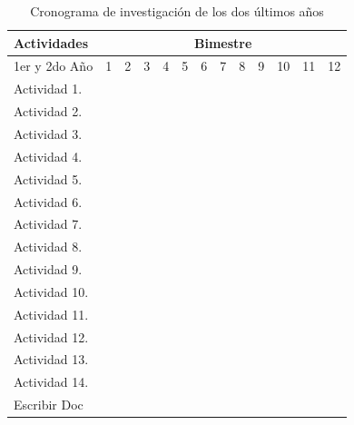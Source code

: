 \documentclass[12pt,twoside,onecolumn,letterpaper]{article}
\begin{document}
\begin{table}[!htb]
  \centering
  \newcommand{\Bk}{\multicolumn{1}{|G|}{ }}
  \begin{tabular}{|p{3.0cm}||c|c|c|c|c|c|c|c|c|c|c|c|}\hline
    Actividades&\multicolumn{12}{|c|}{Bimestre}\\\hline\hline
    1er y  2do A\~no&1&2 &3  &4  &5  &6  &7  &8  &9  &10 &11 &12 \\\hline
    Actividad 1. &\Bk&   &   &   &   &   &   &   &   &   &   &   \\\hline
    Actividad 2. &\Bk&\Bk&\Bk&\Bk&\Bk&\Bk&\Bk&   &   &\Bk&\Bk&   \\\hline
    Actividad 3. &\Bk&\Bk&\Bk&\Bk&\Bk&\Bk&\Bk&   &   &\Bk&\Bk&   \\\hline
    Actividad 4. &\Bk&   &   &   &   &   &   &   &   &   &   &   \\\hline
    Actividad 5. &   &   &   &   &   &   &   &   &   &   &   &   \\\hline
    Actividad 6. &   &   &   &   &\Bk&   &   &   &   &   &   &   \\\hline
    Actividad 7. &\Bk&   &   &\Bk&\Bk&   &   &   &   &   &   &   \\\hline
    Actividad 8. &   &   &   &   &   &   &   &   &   &   &   &   \\\hline
    Actividad 9. &\Bk&   &   &\Bk&\Bk&   &   &\Bk&\Bk&   &   &   \\\hline
    Actividad 10.&   &   &   &   &   &   &\Bk&   &   &   &\Bk&   \\\hline
    Actividad 11.&\Bk&   &   &   &   &   &\Bk&   &   &   &\Bk&   \\\hline
    Actividad 12.&\Bk&\Bk&\Bk&\Bk&\Bk&\Bk&\Bk&\Bk&\Bk&\Bk&\Bk&\Bk\\\hline
    Actividad 13.&   &   &   &\Bk&\Bk&   &   &\Bk&   &   &   &   \\\hline
    Actividad 14.&   &   &   &   &\Bk&\Bk&\Bk&   &\Bk&\Bk&\Bk&\Bk\\\hline
    Escribir Doc &   &\Bk&   &\Bk&   &\Bk&   &\Bk&   &\Bk&\Bk&\Bk\\\hline    
  \end{tabular}
  \caption{Cronograma de investigaci\'on de los dos \'ultimos a\~nos}
  \label{tab:crono2}
\end{table}
\end{document}
